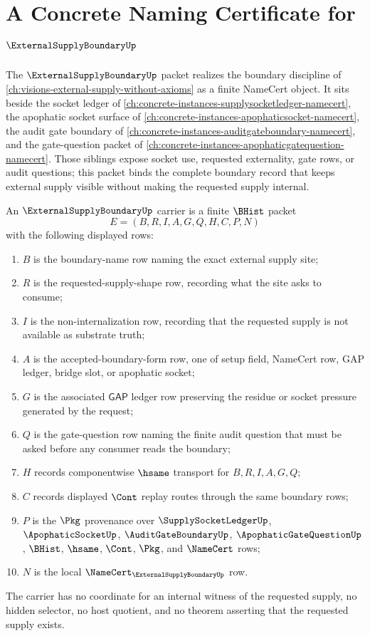 \chapter{A Concrete Naming Certificate for $\ExternalSupplyBoundaryUp$}
\label{ch:concrete-instances-external-supply-boundary-namecert}

The $\ExternalSupplyBoundaryUp$ packet realizes the boundary discipline of \autoref{ch:visions-external-supply-without-axioms} as a finite NameCert object. It sits beside the socket ledger of \autoref{ch:concrete-instances-supplysocketledger-namecert}, the apophatic socket surface of \autoref{ch:concrete-instances-apophaticsocket-namecert}, the audit gate boundary of \autoref{ch:concrete-instances-auditgateboundary-namecert}, and the gate-question packet of \autoref{ch:concrete-instances-apophaticgatequestion-namecert}. Those siblings expose socket use, requested externality, gate rows, or audit questions; this packet binds the complete boundary record that keeps external supply visible without making the requested supply internal.

\begin{definition}
\label{def:external-supply-boundary-carrier}
An $\ExternalSupplyBoundaryUp$ carrier is a finite $\BHist$ packet
$$
E=(B,R,I,A,G,Q,H,C,P,N)
$$
with the following displayed rows:
\begin{enumerate}
\item $B$ is the boundary-name row naming the exact external supply site;
\item $R$ is the requested-supply-shape row, recording what the site asks to consume;
\item $I$ is the non-internalization row, recording that the requested supply is not available as substrate truth;
\item $A$ is the accepted-boundary-form row, one of setup field, NameCert row, GAP ledger, bridge slot, or apophatic socket;
\item $G$ is the associated $\mathsf{GAP}$ ledger row preserving the residue or socket pressure generated by the request;
\item $Q$ is the gate-question row naming the finite audit question that must be asked before any consumer reads the boundary;
\item $H$ records componentwise $\hsame$ transport for $B,R,I,A,G,Q$;
\item $C$ records displayed $\Cont$ replay routes through the same boundary rows;
\item $P$ is the $\Pkg$ provenance over $\SupplySocketLedgerUp$, $\ApophaticSocketUp$, $\AuditGateBoundaryUp$, $\ApophaticGateQuestionUp$, $\BHist$, $\hsame$, $\Cont$, $\Pkg$, and $\NameCert$ rows;
\item $N$ is the local $\NameCert_{\ExternalSupplyBoundaryUp}$ row.
\end{enumerate}
The carrier has no coordinate for an internal witness of the requested supply, no hidden selector, no host quotient, and no theorem asserting that the requested supply exists.
\end{definition}

